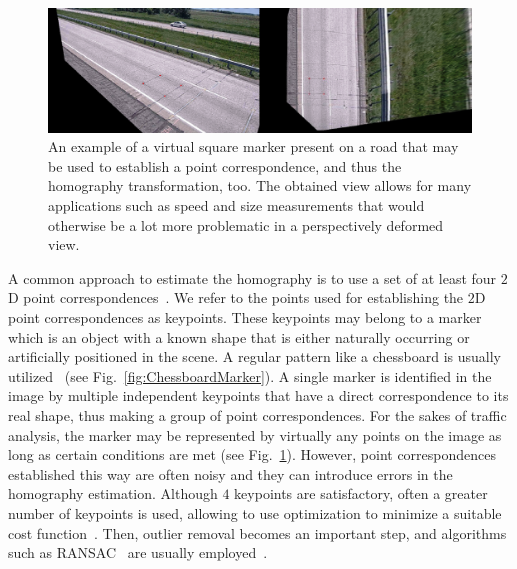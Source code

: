 \begin{figure}[t]
    \centerline{\includegraphics[width=\linewidth]{figures/methodology/homography_road.png}}
    \caption[Square marker on a road]{An example of a virtual square marker present on a road that may be used to establish a point correspondence, and thus the homography transformation, too. The obtained view allows for many applications such as speed and size measurements that would otherwise be a lot more problematic in a perspectively deformed view.}
    \label{fig:RoadMarker}
\end{figure}

A common approach to estimate the homography is to use a set of at least four $2$D point correspondences~\cite{hartley1997defense}. We refer to the points used for establishing the $2$D point correspondences as keypoints. These keypoints may belong to a marker which is an object with a known shape that is either naturally occurring or artificially positioned in the scene. A regular pattern like a chessboard is usually utilized~\cite{zhang2016flexible} (see Fig.~\ref{fig:ChessboardMarker}). A single marker is identified in the image by multiple independent keypoints that have a direct correspondence to its real shape, thus making a group of point correspondences. For the sakes of traffic analysis, the marker may be represented by virtually any points on the image as long as certain conditions are met (see Fig.~\ref{fig:RoadMarker}). However, point correspondences established this way are often noisy and they can introduce errors in the homography estimation. Although $4$ keypoints are satisfactory, often a greater number of keypoints is used, allowing to use optimization to minimize a suitable cost function~\cite{osuna2016multiobjective, mou2013robust}. Then, outlier removal becomes an important step, and algorithms such as RANSAC~\cite{fischler1981random} are usually employed~\cite{osuna2016multiobjective}.

